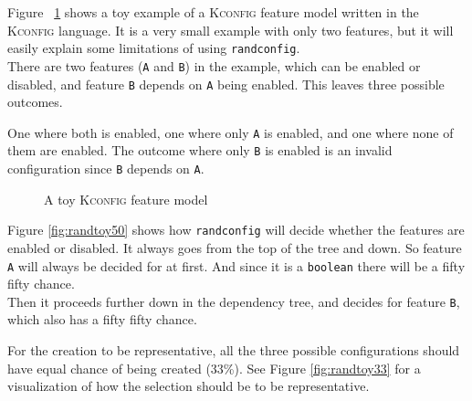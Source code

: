 \documentclass[a4paper,11pt]{report}
\newcommand{\figa}{
    \begin{figure}[!htpb]
    \centering
}
\newcommand{\figb}[2]{
    \caption{#1}
    \label{#2}
    \end{figure}
}
\begin{document}
Figure ~\ref{randconfigtoy} shows a toy example of a \textsc{Kconfig} feature 
model written in the \textsc{Kconfig} language.  It is a very small example 
with only two features, but it will easily explain some limitations of using 
\texttt{randconfig}.
\\

There are two features (\texttt{A} and \texttt{B}) in the example, which can be 
enabled or disabled, and feature \texttt{B} depends on \texttt{A} being enabled.
This leaves three possible outcomes. 

One where both is enabled, one where only \texttt{A} is enabled, and one where 
none of them are enabled. The outcome where only \texttt{B} is enabled is an 
invalid configuration since \texttt{B} depends on \texttt{A}.

\figa
    \subfigure{
        
    }
\figb{A toy \textsc{Kconfig} feature model}{randconfigtoy}

Figure \ref{fig:randtoy50} shows how \texttt{randconfig} will decide whether 
the features are enabled or disabled. It always goes from the top of the tree 
and down. So feature \texttt{A} will always be decided for at first. And since 
it is a \texttt{boolean} there will be a fifty fifty chance.
\\

Then it proceeds further down in the dependency tree, and decides for feature
\texttt{B}, which also has a fifty fifty chance.

For the creation to be representative, all the three possible configurations 
should have equal chance of being created (33\%). See Figure 
\ref{fig:randtoy33} for a visualization of how the selection should 
be to be representative.
\end{document}
